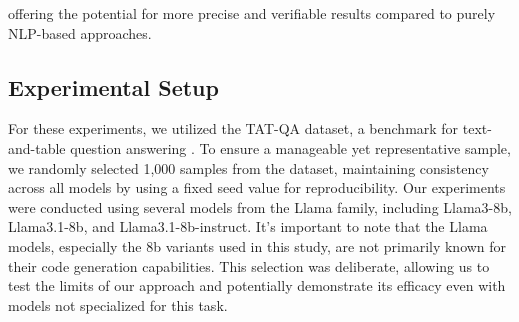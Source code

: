 \documentclass[logo,msc]{infthesis}           %
\begin{document}
offering the potential for more precise and verifiable results compared to purely NLP-based approaches.


\subsection{Experimental Setup}
For these experiments, we utilized the TAT-QA dataset, a benchmark for text-and-table question answering \cite{zhu-etal-2021-tat}. To ensure a manageable yet representative sample, we randomly selected 1,000 samples from the dataset, maintaining consistency across all models by using a fixed seed value for reproducibility. Our experiments were conducted using several models from the Llama family, including Llama3-8b, Llama3.1-8b, and Llama3.1-8b-instruct. It’s important to note that the Llama models, especially the 8b variants used in this study, are not primarily known for their code generation capabilities. This selection was deliberate, allowing us to test the limits of our approach and potentially demonstrate its efficacy even with models not specialized for this task.

\end{document}
